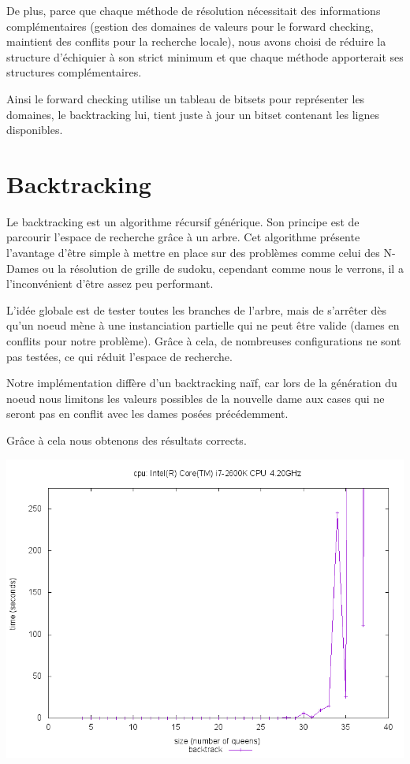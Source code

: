 \documentclass[10pt,a4paper]{report}
\begin{document}
De plus, parce que chaque méthode de résolution nécessitait des informations complémentaires (gestion des domaines de valeurs pour le forward checking, maintient des conflits pour la recherche locale),
nous avons choisi de réduire la structure d'échiquier à son strict minimum et que chaque méthode apporterait ses structures complémentaires.

Ainsi le forward checking utilise un tableau de bitsets pour représenter les domaines, le backtracking lui, tient juste à jour un bitset contenant les lignes disponibles.


\section{Backtracking}

Le backtracking est un algorithme récursif générique. Son principe est de parcourir l'espace de recherche grâce à un arbre.
Cet algorithme présente l'avantage d'être simple à mettre en place sur des problèmes comme celui des N-Dames ou la résolution de grille de sudoku, cependant comme nous le verrons, il a l'inconvénient d'être assez peu performant.

L'idée globale est de tester toutes les branches de l'arbre, mais de s'arrêter dès qu'un noeud mène à une instanciation partielle qui ne peut être valide (dames en conflits pour notre problème).
Grâce à cela, de nombreuses configurations ne sont pas testées, ce qui réduit l'espace de recherche.

Notre implémentation diffère d'un backtracking naïf, car lors de la génération du noeud nous limitons les valeurs possibles de la nouvelle dame aux cases qui ne seront pas en conflit avec les dames posées précédemment.

Grâce à cela nous obtenons des résultats corrects.

\includegraphics[width=1\textwidth]{images/plot_bt_i7.png}
\end{document}
